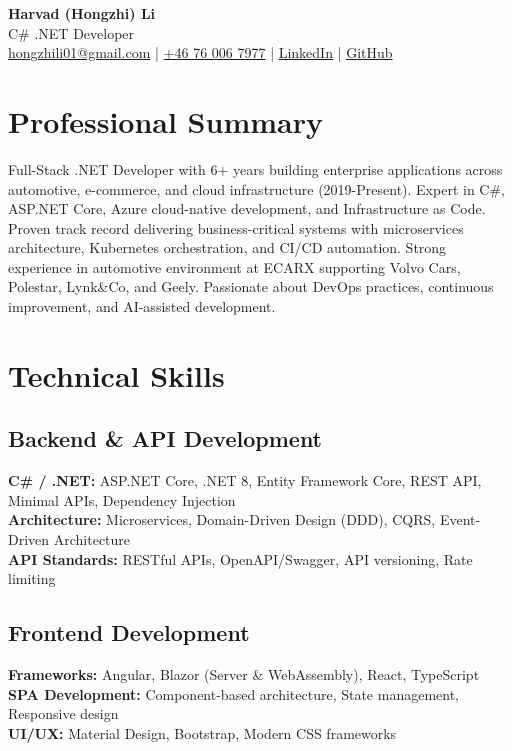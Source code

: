 \documentclass[10pt,a4paper]{article}
\begin{document}
\begin{center}
{\LARGE \textbf{Harvad (Hongzhi) Li}}\\[10pt]
{\Large C\# .NET Developer}\\[10pt]
\textcolor{linkedinblue}{\href{mailto:hongzhili01@gmail.com}{hongzhili01@gmail.com} | \href{tel:+46760067977}{+46 76 006 7977} | \href{https://www.linkedin.com/in/harvad/}{LinkedIn} | \href{https://github.com/bluehawana}{GitHub}}
\end{center}

\vspace{0.3cm}

\section*{Professional Summary}
Full-Stack .NET Developer with 6+ years building enterprise applications across automotive, e-commerce, and cloud infrastructure (2019-Present). Expert in C\#, ASP.NET Core, Azure cloud-native development, and Infrastructure as Code. Proven track record delivering business-critical systems with microservices architecture, Kubernetes orchestration, and CI/CD automation. Strong experience in automotive environment at ECARX supporting Volvo Cars, Polestar, Lynk\&Co, and Geely. Passionate about DevOps practices, continuous improvement, and AI-assisted development.

\vspace{0.2cm}

\section*{Technical Skills}

\subsection*{Backend \& API Development}
\textbf{C\# / .NET:} ASP.NET Core, .NET 8, Entity Framework Core, REST API, Minimal APIs, Dependency Injection\\
\textbf{Architecture:} Microservices, Domain-Driven Design (DDD), CQRS, Event-Driven Architecture\\
\textbf{API Standards:} RESTful APIs, OpenAPI/Swagger, API versioning, Rate limiting

\subsection*{Frontend Development}
\textbf{Frameworks:} Angular, Blazor (Server \& WebAssembly), React, TypeScript\\
\textbf{SPA Development:} Component-based architecture, State management, Responsive design\\
\textbf{UI/UX:} Material Design, Bootstrap, Modern CSS frameworks
\end{document}
